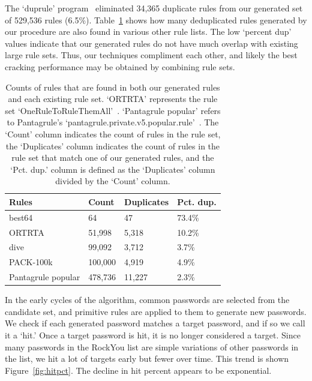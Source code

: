 \documentclass[letterpaper,twocolumn,10pt]{article}
\begin{document}
The `duprule' program~\cite{duprule} eliminated 34,365 duplicate rules from our
generated set of 529,536 rules (6.5\%). Table~\ref{tab:dups} shows how many
deduplicated rules generated by our procedure are also found in various other
rule lists. The low `percent dup' values indicate that our generated rules do
not have much overlap with existing large rule sets. Thus, our techniques
compliment each other, and likely the best cracking performance may be obtained
by combining rule sets.

\begin{table}
\centering
\begin{tabular}{|l|l|l|l|}
    \hline
    Rules & Count & Duplicates & Pct. dup. \\
    \hline
    best64 & 64 & 47 & 73.4\% \\
    ORTRTA & 51,998 & 5,318 & 10.2\% \\
    dive & 99,092 & 3,712 & 3.7\% \\
    PACK-100k & 100,000 & 4,919 & 4.9\% \\
    Pantagrule popular & 478,736 & 11,227 & 2.3\% \\
    \hline
\end{tabular}
\caption{Counts of rules that are found in both our generated rules and each
existing rule set. `ORTRTA' represents the rule set
`OneRuleToRuleThemAll'~\cite{ortrta}. `Pantagrule popular' refers to
Pantagrule's `pantagrule.private.v5.popular.rule'~\cite{pantagrule}. The `Count'
column indicates the count of rules in the rule set, the `Duplicates' column
indicates the count of rules in the rule set that match one of our generated
rules, and the `Pct. dup.' column is defined as the `Duplicates' column divided
by the `Count' column.}
\label{tab:dups}
\end{table}

In the early cycles of the algorithm, common passwords are selected from the
candidate set, and primitive rules are applied to them to generate new
passwords. We check if each generated password matches a target password, and
if so we call it a `hit.' Once a target password is hit, it is no longer
considered a target. Since many passwords in the RockYou list are simple
variations of other passwords in the list, we hit a lot of targets early but
fewer over time. This trend is shown Figure~\ref{fig:hitpct}. The decline in
hit percent appears to be exponential.
\end{document}
